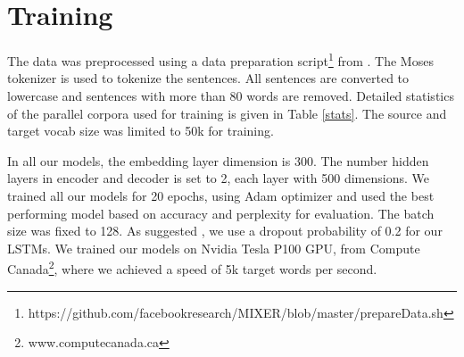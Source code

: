 \section{Training}
\label{preprocess}
The data was preprocessed using a data preparation script\footnote{https://github.com/facebookresearch/MIXER/blob/master/prepareData.sh} from \cite{ranzato2015sequence}. The Moses tokenizer is used to tokenize the sentences. All sentences are converted to lowercase and sentences with more than 80 words are removed. Detailed statistics of the parallel corpora used for training is given in Table \ref{stats}. The source and target vocab size was limited to 50k for training.
 
In all our models, the embedding layer dimension is 300. The number hidden layers in encoder and decoder is set to 2, each layer with 500 dimensions. We trained all our models for 20 epochs, using Adam optimizer and used the best performing model based on accuracy and perplexity for evaluation. The batch size was fixed to 128. As suggested \cite{luong2015effective}, we use a dropout probability of 0.2 for our LSTMs. We trained our models on Nvidia Tesla P100 GPU, from Compute Canada\footnote{www.computecanada.ca}, where we achieved a speed of 5k target words per second.  


%		
%

